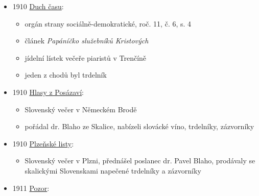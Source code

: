 \begin{itemize}
  \begin{itemize}
  \tightlist
  \item
    článek \emph{Z Gallašovy literární pozůstalosti},
  \item
    porovnává popis valašský kuchyně v Gallašově Bromatologii s tím, co
    popisoval v Múze Morawské
  \item
    pokračování článku z minulýho čísla
  \item
    popisuje masopust, autor článku připomíná, že zapomněl na trdelníky,
    protože v rukopisech popisuje, že koblihy a trdelníky jsou pokrm pro
    řemeslníky
  \item
    s. 219 v panských kuchyních i trdelníky
  \item
    kritizuje, že Gallašův spisek má k vědečkosti ještě dál, než k
    úplnosti
  \end{itemize}
\item
  1910
  \href{https://www.digitalniknihovna.cz/svkos/uuid/uuid:ed266fe6-7cde-4b4f-b48b-535065c79148}{Duch
  času}:

  \begin{itemize}
  \tightlist
  \item
    orgán strany sociálně-demokratické, roč. 11, č. 6, s. 4
  \item
    článek \emph{Papáníčko služebníků Kristových}
  \item
    jídelní lístek večeře piaristů v Trenčíně
  \item
    jeden z chodů byl trdelník
  \end{itemize}
\item
  1910
  \href{https://www.digitalniknihovna.cz/kkvhb/uuid/uuid:36aafa7f-b4da-4aa1-98bb-f7c37a63c6f9}{Hlasy
  z Posázaví}:

  \begin{itemize}
  \tightlist
  \item
    Slovenský večer v Německém Brodě
  \item
    pořádal dr. Blaho ze Skalice, nabízeli slovácké víno, trdelníky,
    zázvorníky
  \end{itemize}
\item
  1910
  \href{https://www.digitalniknihovna.cz/svkpk/uuid/uuid:a6e44360-dde9-11df-a9cc-000d606f5dc6}{Plzeňské
  listy}:

  \begin{itemize}
  \tightlist
  \item
    Slovenský večer v Plzni, přednášel poslanec dr. Pavel Blaho,
    prodávaly se skalickými Slovenskami napečené trdelníky a zázvorníky
  \end{itemize}
\item
  1911
  \href{https://www.digitalniknihovna.cz/vkol/uuid/uuid:be493458-5dbc-42df-9ca1-fa5bef6ae4c6}{Pozor}:


\end{itemize}
